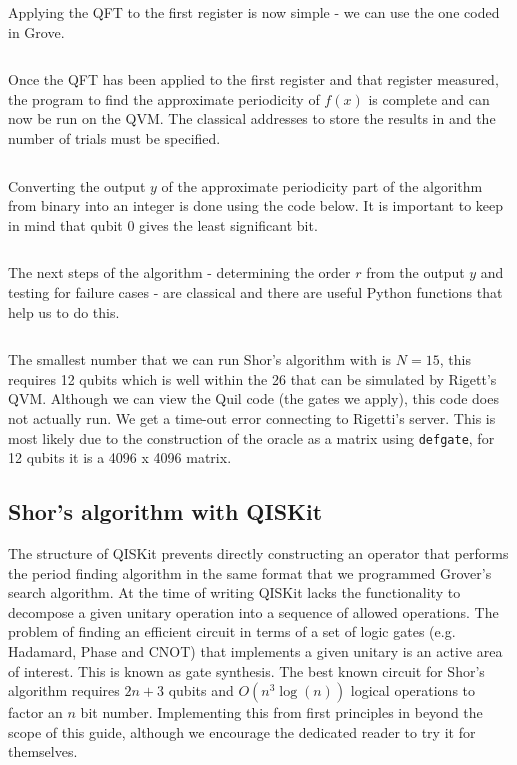\inputminted[firstnumber=64, firstline=64, lastline=66]{python}{code/pyQuil/shor_pyquil_guide.txt}

Applying the QFT to the first register is now simple - we can use the one coded in Grove.

\inputminted[firstnumber=68, firstline=68, lastline=69]{python}{code/pyQuil/shor_pyquil_guide.txt}

Once the QFT has been applied to the first register and that register measured, the program to find the approximate periodicity of $f(x)$ is complete and can now be run on the QVM. The classical addresses to store the results in and the number of trials must be specified.

\inputminted[firstnumber=75, firstline=75, lastline=77]{python}{code/pyQuil/shor_pyquil_guide.txt}

Converting the output $y$ of the approximate periodicity part of the algorithm from binary into an integer is done using the code below. It is important to keep in mind that qubit 0 gives the least significant bit.

\inputminted[firstnumber=79, firstline=79, lastline=82]{python}{code/pyQuil/shor_pyquil_guide.txt}

The next steps of the algorithm - determining the order $r$ from the output $y$ and testing for failure cases - are classical and there are useful Python functions that help us to do this.

\inputminted[firstnumber=84, firstline=84, lastline=99]{python}{code/pyQuil/shor_pyquil_guide.txt}

The smallest number that we can run Shor's algorithm with is $N = 15$, this requires 12 qubits which is well within the 26 that can be simulated by Rigett's QVM. Although we can view the Quil code (the gates we apply), this code does not actually run. We get a time-out error connecting to Rigetti's server. This is most likely due to the construction of the oracle as a matrix using \texttt{defgate}, for 12 qubits it is a 4096 x 4096 matrix. 

\subsection{Shor's algorithm with QISKit}

The structure of QISKit prevents directly constructing an operator that performs the period finding algorithm in the same format that we programmed Grover's search algorithm. At the time of writing QISKit lacks the functionality to decompose a given unitary operation into a sequence of allowed operations. The problem of finding an efficient circuit in terms of a set of logic gates (e.g. Hadamard, Phase and CNOT) that implements a given unitary is an active area of interest. This is known as gate synthesis. The best known circuit for Shor's algorithm requires $2n+3$ qubits and $O (n^3 \log (n))$ logical operations to factor an $n$ bit number\cite{beauregard2003ShorImplementation}. Implementing this from first principles in beyond the scope of this guide, although we encourage the dedicated reader to try it for themselves. 


